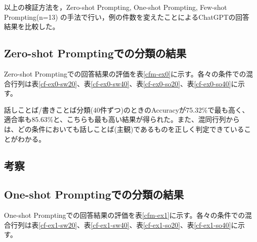 


以上の検証方法を，Zero-shot Prompting, One-shot Prompting, Few-shot Prompting(n=13) の手法で行い，例の件数を変えたことによるChatGPTの回答結果を比較した。

\subsection{Zero-shot Promptingでの分類の結果}
Zero-shot Promptingでの回答結果の評価を表\ref{cfm-ex0}に示す。各々の条件での混合行列は表\ref{cf-ex0-sw20}、表\ref{cf-ex0-sw40}、表\ref{cf-ex0-so20}、表\ref{cf-ex0-so40}に示す。






話しことば/書きことば分類(40件ずつ)のときのAccuracyが75.32\%で最も高く、適合率も85.63\%と、こちらも最も高い結果が得られた。また、混同行列からは、どの条件においても話しことば(主観)であるものを正しく判定できていることがわかる。

\subsection{考察}

\subsection{One-shot Promptingでの分類の結果}
One-shot Promptingでの回答結果の評価を表\ref{cfm-ex1}に示す。各々の条件での混合行列は表\ref{cf-ex1-sw20}、表\ref{cf-ex1-sw40}、表\ref{cf-ex1-so20}、表\ref{cf-ex1-so40}に示す。





